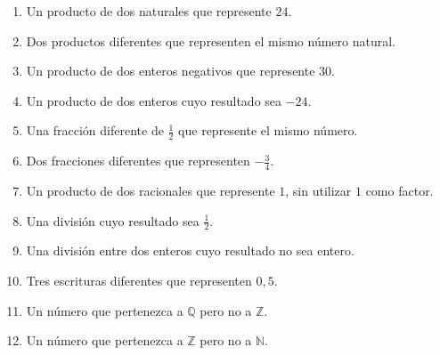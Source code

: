 \begin{enumerate}
\item Un producto de dos naturales que represente \(24\).
\item Dos productos diferentes que representen el mismo número natural.
\item Un producto de dos enteros negativos que represente \(30\).
\item Un producto de dos enteros cuyo resultado sea \(-24\).
\item Una fracción diferente de \(\frac12\) que represente el mismo número.
\item Dos fracciones diferentes que representen \(-\frac34\).
\item Un producto de dos racionales que represente \(1\), sin utilizar \(1\) como factor.
\item Una división cuyo resultado sea \(\frac12\).
\item Una división entre dos enteros cuyo resultado no sea entero.
\item Tres escrituras diferentes que representen \(0{,}5\).
\item Un número que pertenezca a \(\mathbb Q\) pero no a \(\mathbb Z\).
\item Un número que pertenezca a \(\mathbb Z\) pero no a \(\mathbb N\).
\end{enumerate}
